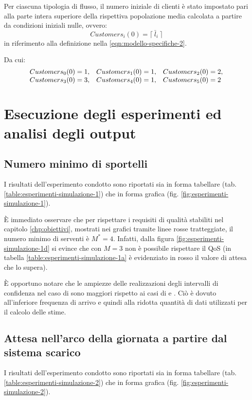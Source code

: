 Per ciascuna tipologia di flusso, il numero iniziale di clienti è stato impostato pari alla parte intera superiore della rispettiva popolazione media calcolata a partire da condizioni iniziali nulle, ovvero:
\begin{equation}
Customers_i(0) = \lceil\ \bar{l}_i\ \rceil
\end{equation}
in riferimento alla definizione nella \ref{eqn:modello-specifiche-2}.

Da cui:
\begin{equation}
\begin{array}{l l l}
Customers_0(0) = 1, & Customers_1(0) = 1, & Customers_2(0) = 2, \\
Customers_3(0) = 3, & Customers_4(0) = 1, & Customers_5(0) = 2
\end{array}
\end{equation}
	
\section{Esecuzione degli esperimenti ed analisi degli output}
\subsection*{Numero minimo di sportelli}
I risultati dell'esperimento condotto sono riportati sia in forma tabellare (tab. \ref{table:esperimenti-simulazione-1}) che in forma grafica (fig. \ref{fig:esperimenti-simulazione-1}).

È immediato osservare che per rispettare i requisiti di qualità stabiliti nel capitolo \ref{chp:obiettivi}, mostrati nei grafici tramite linee rosse tratteggiate, il numero minimo di serventi è $M^* = 4$. Infatti, dalla figura \ref{fig:esperimenti-simulazione-1d} si evince che con $M = 3$ non è possibile rispettare il QoS (in tabella \ref{table:esperimenti-simulazione-1a} è evidenziato in {\color{red}rosso} il valore di  attesa che lo supera).

È opportuno notare che le ampiezze delle realizzazioni degli intervalli di confidenza nel caso di \sr{} sono maggiori rispetto ai casi di \uo{} e \pp{}. Ciò è dovuto all'inferiore frequenza di arrivo e quindi alla ridotta quantità di dati utilizzati per il calcolo delle stime.

\subsection*{Attesa nell'arco della giornata a partire dal sistema scarico}
I risultati dell'esperimento condotto sono riportati sia in forma tabellare (tab. \ref{table:esperimenti-simulazione-2}) che in forma grafica (fig. \ref{fig:esperimenti-simulazione-2}).

